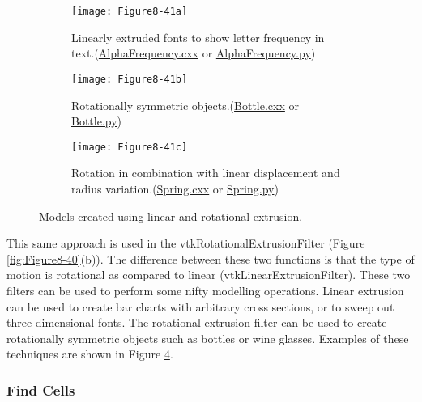 \begin{figure}[!htb]
    \centering
    \begin{subfigure}{0.96\linewidth}
        \centering
        \texttt{[image: Figure8-41a]}
        \caption{Linearly extruded fonts to show letter frequency in text.(\href{https://lorensen.github.io/VTKExamples/site/Cxx/Visualization/AlphaFrequency/}{AlphaFrequency.cxx} or \href{https://lorensen.github.io/VTKExamples/site/Python/Visualization/AlphaFrequency/}{AlphaFrequency.py})}\label{fig:Figure8-41a}
    \end{subfigure}
    \hfill
    \begin{subfigure}{0.48\linewidth}
        \centering
        \texttt{[image: Figure8-41b]}
        \caption{Rotationally symmetric objects.(\href{https://lorensen.github.io/VTKExamples/site/Cxx/Modelling/Bottle/}{Bottle.cxx} or \href{https://lorensen.github.io/VTKExamples/site/Python/Modelling/Bottle/}{Bottle.py})}\label{fig:Figure8-41b}
    \end{subfigure}%
    \hfill
    \begin{subfigure}{0.48\linewidth}
        \centering
        \texttt{[image: Figure8-41c]}
        \caption{Rotation in combination with linear displacement and radius variation.(\href{https://lorensen.github.io/VTKExamples/site/Cxx/Modelling/Spring/}{Spring.cxx} or \href{https://lorensen.github.io/VTKExamples/site/Python/Modelling/Spring/}{Spring.py})}\label{fig:Figure8-41c}
    \end{subfigure}%
    \caption{Models created using linear and rotational extrusion.}
    \label{fig:Figure8-41}
\end{figure}

This same approach is used in the vtkRotationalExtrusionFilter (Figure \ref{fig:Figure8-40}(b)). The difference between these two functions is that the type of motion is rotational as compared to linear (vtkLinearExtrusionFilter). These two filters can be used to perform some nifty modelling operations. Linear extrusion can be used to create bar charts with arbitrary cross sections, or to sweep out three-dimensional fonts. The rotational extrusion filter can be used to create rotationally symmetric objects such as bottles or wine glasses. Examples of these techniques are shown in Figure \ref{fig:Figure8-41}.

\subsubsection{Find Cells}

